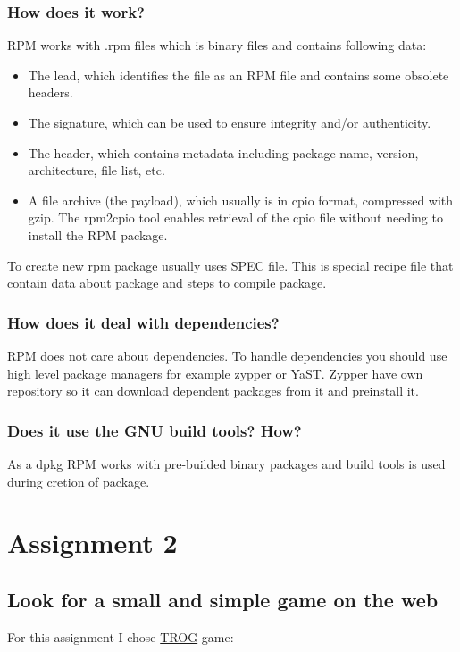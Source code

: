 \documentclass[a4paper,11pt]{article}
\begin{document}
\subsubsection{How does it work?}
RPM works with .rpm files which is binary files and contains following data:

\begin{itemize}
  \item The lead, which identifies the file as an RPM file and contains some obsolete headers.
  \item The signature, which can be used to ensure integrity and/or authenticity.
  \item The header, which contains metadata including package name, version, architecture, file list, etc.
  \item A file archive (the payload), which usually is in cpio format, compressed with gzip. The rpm2cpio tool enables retrieval of the cpio file without needing to install the RPM package.
\end{itemize}

To create new rpm package usually uses SPEC file. This is special recipe file that contain data about package and steps to compile package. 

\subsubsection{How does it deal with dependencies?}
RPM does not care about dependencies. To handle dependencies you should use high level package managers for example zypper or YaST. Zypper have own repository so it can download dependent packages from it and preinstall it.
\subsubsection{Does it use the GNU build tools? How?}
As a dpkg RPM works with pre-builded binary packages and build tools is used during cretion of package.


\section{Assignment 2}
\subsection{Look for a small and simple game on the web}
For this assignment I chose \href{https://github.com/JohnAnthony/TROG}{TROG} game: 
\end{document}
